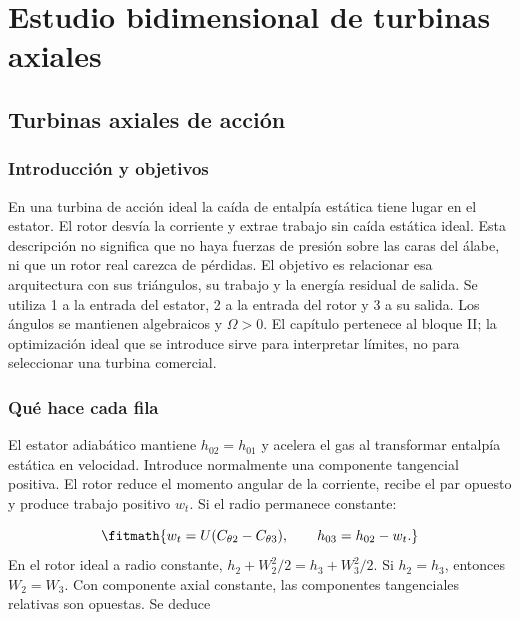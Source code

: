 \documentclass[10pt,openany]{book}
\begin{document}
\studiumchaptercheck

\part{Estudio bidimensional de turbinas axiales}

\chapter{Turbinas axiales de acción}
\label{chap:c04}


\section{Introducción y objetivos}

En una turbina de acción ideal la caída de entalpía estática tiene lugar en el estator. El rotor desvía la corriente y extrae trabajo sin caída estática ideal. Esta descripción no significa que no haya fuerzas de presión sobre las caras del álabe, ni que un rotor real carezca de pérdidas. El objetivo es relacionar esa arquitectura con sus triángulos, su trabajo y la energía residual de salida.
Se utiliza 1 a la entrada del estator, 2 a la entrada del rotor y 3 a su salida. Los ángulos se mantienen algebraicos y \(\Omega>0\). El capítulo pertenece al bloque II; la optimización ideal que se introduce sirve para interpretar límites, no para seleccionar una turbina comercial.

\section{Qué hace cada fila}

El estator adiabático mantiene \(h_{02}=h_{01}\) y acelera el gas al transformar entalpía estática en velocidad. Introduce normalmente una componente tangencial positiva. El rotor reduce el momento angular de la corriente, recibe el par opuesto y produce trabajo positivo \(w_t\). Si el radio permanece constante:

\[
\fitmath{w_t=U(C_{\theta2}-C_{\theta3}),\qquad
h_{03}=h_{02}-w_t.}
\]
En el rotor ideal a radio constante, \(h_2+W_2^2/2=h_3+W_3^2/2\). Si \(h_2=h_3\), entonces \(W_2=W_3\). Con componente axial constante, las componentes tangenciales relativas son opuestas. Se deduce
\end{document}
